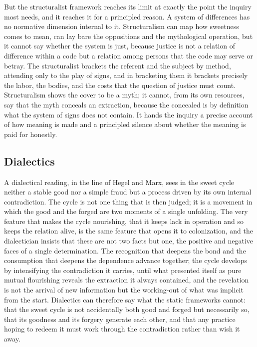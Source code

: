 But the structuralist framework reaches its limit at exactly the point the inquiry most needs, and it reaches it for a principled reason. A system of differences has no normative dimension internal to it. Structuralism can map how sweetness comes to mean, can lay bare the oppositions and the mythological operation, but it cannot say whether the system is just, because justice is not a relation of difference within a code but a relation among persons that the code may serve or betray. The structuralist brackets the referent and the subject by method, attending only to the play of signs, and in bracketing them it brackets precisely the labor, the bodies, and the costs that the question of justice must count. Structuralism shows the cover to be a myth; it cannot, from its own resources, say that the myth conceals an extraction, because the concealed is by definition what the system of signs does not contain. It hands the inquiry a precise account of how meaning is made and a principled silence about whether the meaning is paid for honestly.

\subsection{Dialectics}

A dialectical reading, in the line of Hegel and Marx, sees in the sweet cycle neither a stable good nor a simple fraud but a process driven by its own internal contradiction. The cycle is not one thing that is then judged; it is a movement in which the good and the forged are two moments of a single unfolding. The very feature that makes the cycle nourishing, that it keeps lack in operation and so keeps the relation alive, is the same feature that opens it to colonization, and the dialectician insists that these are not two facts but one, the positive and negative faces of a single determination. The recognition that deepens the bond and the consumption that deepens the dependence advance together; the cycle develops by intensifying the contradiction it carries, until what presented itself as pure mutual flourishing reveals the extraction it always contained, and the revelation is not the arrival of new information but the working-out of what was implicit from the start. Dialectics can therefore say what the static frameworks cannot: that the sweet cycle is not accidentally both good and forged but necessarily so, that its goodness and its forgery generate each other, and that any practice hoping to redeem it must work through the contradiction rather than wish it away.

